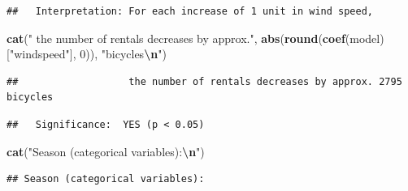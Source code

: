 \documentclass[
]{article}
\newenvironment{Shaded}{\begin{snugshade}}{\end{snugshade}}
\newcommand{\ControlFlowTok}[1]{\textcolor[rgb]{0.13,0.29,0.53}{\textbf{#1}}}
\newcommand{\DecValTok}[1]{\textcolor[rgb]{0.00,0.00,0.81}{#1}}
\newcommand{\FloatTok}[1]{\textcolor[rgb]{0.00,0.00,0.81}{#1}}
\newcommand{\FunctionTok}[1]{\textcolor[rgb]{0.13,0.29,0.53}{\textbf{#1}}}
\newcommand{\NormalTok}[1]{#1}
\newcommand{\SpecialCharTok}[1]{\textcolor[rgb]{0.81,0.36,0.00}{\textbf{#1}}}
\newcommand{\StringTok}[1]{\textcolor[rgb]{0.31,0.60,0.02}{#1}}
\begin{document}
\begin{verbatim}
##   Interpretation: For each increase of 1 unit in wind speed,
\end{verbatim}

\begin{Shaded}
\begin{Highlighting}[]
\FunctionTok{cat}\NormalTok{(}\StringTok{"                  the number of rentals decreases by approx."}\NormalTok{, }\FunctionTok{abs}\NormalTok{(}\FunctionTok{round}\NormalTok{(}\FunctionTok{coef}\NormalTok{(model)[}\StringTok{"windspeed"}\NormalTok{], }\DecValTok{0}\NormalTok{)), }\StringTok{"bicycles}\SpecialCharTok{\textbackslash{}n}\StringTok{"}\NormalTok{)}
\end{Highlighting}
\end{Shaded}

\begin{verbatim}
##                   the number of rentals decreases by approx. 2795 bicycles
\end{verbatim}

\begin{Shaded}
\end{Shaded}

\begin{verbatim}
##   Significance:  YES (p < 0.05)
\end{verbatim}

\begin{Shaded}
\begin{Highlighting}[]
\FunctionTok{cat}\NormalTok{(}\StringTok{"Season (categorical variables):}\SpecialCharTok{\textbackslash{}n}\StringTok{"}\NormalTok{)}
\end{Highlighting}
\end{Shaded}

\begin{verbatim}
## Season (categorical variables):
\end{verbatim}
\end{document}
